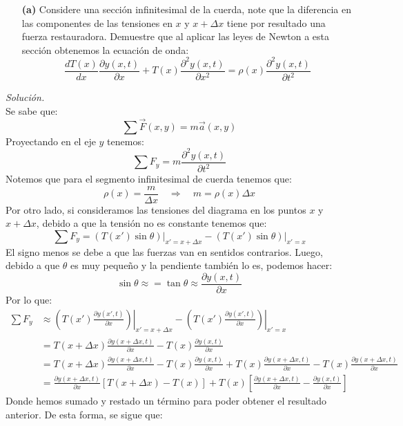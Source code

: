 \documentclass[11pt]{article}
\begin{document}
\begin{enumerate}
	\item [\textbf{(a)}] Considere una sección infinitesimal de la cuerda, note que la diferencia en las componentes de las tensiones en $x$ y $x + \Delta x$ tiene por resultado una fuerza restauradora.	Demuestre que al aplicar las leyes de Newton a esta sección obtenemos la ecuación de onda:
			\begin{equation*}
				\frac{dT(x)}{dx}\frac{\partial y(x,t)}{\partial x} + T(x)\frac{\partial^2 y(x,t)}{\partial x^2} = \rho(x) \frac{\partial^2 y(x,t)}{\partial t^2}
			\end{equation*}
\end{enumerate}
\textit{Solución.}\\
	Se sabe que:
	$$\sum \vec{F}(x,y) = m \vec{a}(x,y)$$
	Proyectando en el eje $y$ tenemos:
	$$\sum F_y = m \frac{\partial^2 y(x,t)}{\partial t ^2}$$
	Notemos que para el segmento infinitesimal de cuerda tenemos que:
	$$\rho(x) = \frac{m}{\Delta x} \quad\Rightarrow\quad m = \rho (x) \Delta x$$
	Por otro lado, si consideramos las tensiones del diagrama en los puntos $x$ y $x+\Delta x$, debido a que la tensión no es constante tenemos que:
	$$\sum F_y = \left.\left( T(x') \sin \theta \right)\right|_{x' = x + \Delta x} -\left.\left( T(x') \sin \theta \right)\right|_{x' = x}$$
	El signo menos se debe a que las fuerzas van en sentidos contrarios. Luego, debido a que $\theta$ es muy pequeño y la pendiente también lo es, podemos hacer:
	$$\sin\theta \approx =\tan\theta\approx\frac{\partial y(x,t)}{\partial x}$$
	Por lo que:
	\begin{align*}
	\sum F_y &\approx \left.\left( T(x') \frac{\partial y(x',t)}{\partial x} \right)\right|_{x' = x + \Delta x} -\left.\left( T(x') \frac{\partial y(x',t)}{\partial x} \right)\right|_{x' = x}	\\
	&= T(x+\Delta x) \frac{\partial y(x+\Delta x,t)}{\partial x} - T(x)\frac{\partial y(x,t)}{\partial x}	\\
	&=  T(x+\Delta x) \frac{\partial y(x+\Delta x,t)}{\partial x} - T(x)\frac{\partial y(x,t)}{\partial x} + T(x) \frac{\partial y(x+\Delta x, t)}{\partial x} -  T(x) \frac{\partial y(x+\Delta x, t)}{\partial x}	\\
	&=\frac{\partial y(x+\Delta x, t)}{\partial x}\left[ T(x +\Delta x) - T(x)\right]+ T(x)\left[\frac{\partial y(x+\Delta x, t)}{\partial x}- \frac{\partial y(x, t)}{\partial x}\right]
	\end{align*}
	Donde hemos sumado y restado un término para poder obtener el resultado anterior. De esta forma, se sigue que:
\end{document}
